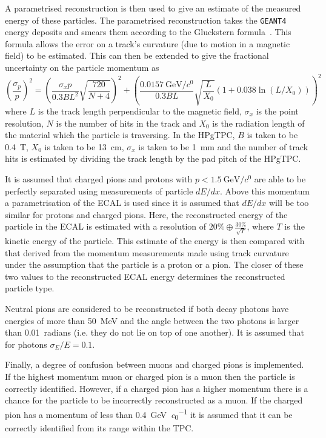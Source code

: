 A parametrised reconstruction is then used to give an estimate of the measured energy of these particles.
The parametrised reconstruction takes the \texttt{GEANT4} energy deposits and smears them according to the Gluckstern formula~\cite{gluckstern}.
This formula allows the error on a track's curvature (due to motion in a magnetic field) to be estimated.
This can then be extended to give the fractional uncertainty on the particle momentum as
\begin{equation}
	\left(\frac{\sigma_{p}}{p}\right)^{2} = \left( \frac{\sigma_{x} p}{0.3 B L^{2}} \sqrt{ \frac{720}{N+4} } \right)^{2} +
	\left( \frac{\SI{0.0157}{\GeV\per\clight}}{0.3BL}\sqrt{\frac{L}{X_{0}}}\left( 1 + 0.038 \ln(L/X_{0}) \right) \right)^{2}
\end{equation}
where $L$ is the track length perpendicular to the magnetic field, $\sigma_{x}$ is the point resolution, $N$ is the number of hits in the track and $X_0$ is the radiation length of the material which the particle is traversing.
In the HPgTPC, $B$ is taken to be \SI{0.4}{\tesla}, $X_{0}$ is taken to be \SI{13}{\cm}, $\sigma_{x}$ is taken to be \SI{1}{\mm} and the number of track hits is estimated by dividing the track length by the pad pitch of the HPgTPC.

It is assumed that charged pions and protons with $p < \SI{1.5}{\GeV\per\clight}$ are able to be perfectly separated using measurements of particle $dE/dx$.
Above this momentum a parametrisation of the ECAL is used since it is assumed that $dE/dx$ will be too similar for protons and charged pions.
Here, the reconstructed energy of the particle in the ECAL is estimated with a resolution of 
$20\% \oplus \frac{30\%}{\sqrt{T}}$, where $T$ is the kinetic energy of the particle.
This estimate of the energy is then compared with that derived from the momentum measurements made using track curvature under the assumption that the particle is a proton or a pion.
The closer of these two values to the reconstructed ECAL energy determines the reconstructed particle type.

Neutral pions are considered to be reconstructed if both decay photons have energies of more than \SI{50}{\MeV} and the angle between the two photons is larger than 0.01~radians (i.e. they do not lie on top of one another).
It is assumed that for photons $\sigma_{E}/E = 0.1$.

Finally, a degree of confusion between muons and charged pions is implemented.
If the highest momentum muon or charged pion is a muon then the particle is correctly identified.
However, if a charged pion has a higher momentum there is a chance for the particle to be incorrectly reconstructed as a muon.
If the charged pion has a momentum of less than \SI{0.4}{\GeV\per\clight} it is assumed that it can be correctly identified from its range within the TPC.

